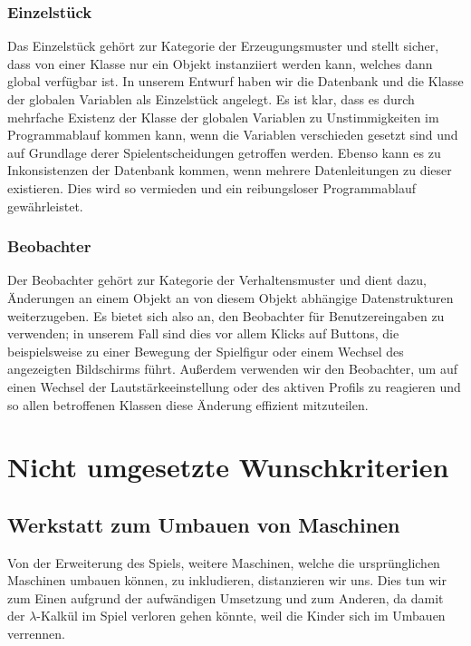 \subsection{Einzelstück}
Das Einzelstück gehört zur Kategorie der Erzeugungsmuster und stellt sicher, dass von einer Klasse nur ein Objekt instanziiert werden kann, welches dann global verfügbar ist. In unserem Entwurf haben wir die Datenbank und die Klasse der globalen Variablen als Einzelstück angelegt. Es ist klar, dass es durch mehrfache Existenz der Klasse der globalen Variablen zu Unstimmigkeiten im Programmablauf kommen kann, wenn die Variablen verschieden gesetzt sind und auf Grundlage derer Spielentscheidungen getroffen werden. Ebenso kann es zu Inkonsistenzen der Datenbank kommen, wenn mehrere Datenleitungen zu dieser existieren. Dies wird so vermieden und ein reibungsloser Programmablauf gewährleistet.

\subsection{Beobachter}
Der Beobachter gehört zur Kategorie der Verhaltensmuster und dient dazu, Änderungen an einem Objekt an von diesem Objekt abhängige Datenstrukturen weiterzugeben. Es bietet sich also an, den Beobachter für Benutzereingaben zu verwenden; in unserem Fall sind dies vor allem Klicks auf Buttons, die beispielsweise zu einer Bewegung der Spielfigur oder einem Wechsel des angezeigten Bildschirms führt. Außerdem verwenden wir den Beobachter, um auf einen Wechsel der Lautstärkeeinstellung oder des aktiven Profils zu reagieren und so allen betroffenen Klassen diese Änderung effizient mitzuteilen.

\clearpage

\chapter{Nicht umgesetzte Wunschkriterien}

\section{Werkstatt zum Umbauen von Maschinen}

Von der Erweiterung des Spiels, weitere Maschinen, welche die ursprünglichen Maschinen umbauen können, zu inkludieren, distanzieren wir uns. Dies tun wir zum Einen aufgrund der aufwändigen Umsetzung und zum Anderen, da damit der $\lambda$-Kalkül im Spiel verloren gehen könnte, weil die Kinder sich im Umbauen verrennen.

